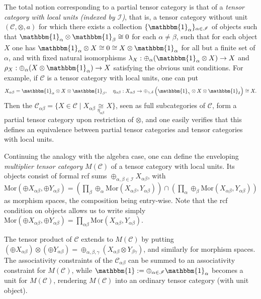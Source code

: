 \documentclass[10pt]{article}
\newcommand{\CatC}{\mathcal{C}}
\newcommand{\Mor}{\mathrm{Mor}}
\newcommand{\Unitb}{\mathbbm{1}}
\theoremstyle{definition}
\numberwithin{equation}{section}
\begin{document}
The total notion corresponding to a partial tensor category is that of a \emph{tensor category with local units (indexed by $\mathscr{I}$)}, that is, a tensor category without unit $(\CatC,\otimes,a)$  for which there exists a collection $\{\Unitb_\alpha\}_{\alpha\in \mathscr{I}}$ of objects such that $\Unitb_\alpha\otimes \Unitb_\beta \cong 0$ for each $\alpha\neq \beta$, such that for each object $X$ one has $\Unitb_\alpha\otimes X \cong 0 \cong X\otimes \Unitb_\alpha$ for all but a finite set of $\alpha$, and with fixed natural isomorphisms $\lambda_X:\oplus_\alpha (\Unitb_\alpha\otimes X) \rightarrow X$ and $\rho_X:\oplus_\alpha(X\otimes \Unitb_\alpha)\rightarrow X$ satisfying the obvious unit conditions. For example, if $\CatC$ is a tensor category with local units, one can put \[X_{\alpha\beta} = \Unitb_\alpha\otimes X \otimes \Unitb_\beta, \quad \eta_{\alpha\beta}:X_{\alpha\beta} \rightarrow \oplus_{\gamma,\delta} \left(\Unitb_\gamma \otimes X \otimes \Unitb_\delta\right) \cong X.\]  Then the $\CatC_{\alpha\beta} = \{X \in \CatC\mid X_{\alpha\beta} \underset{\eta_{\alpha\beta}}{\cong} X\}$, seen as full subcategories of $\CatC$, form a partial tensor category upon restriction of $\otimes$, and one easily verifies that this defines an equivalence between partial tensor categories and tensor categories with local units. 

Continuing the analogy with the algebra case, one can define the enveloping \emph{multiplier tensor category} $M(\CatC)$ of a tensor category with local units. Its objects consist of formal rcf sums $\oplus_{\alpha,\beta\in \mathscr{I}} X_{\alpha\beta}$, with $\Mor(\oplus X_{\alpha\beta},\oplus Y_{\alpha\beta}) = \left(\prod_\beta\oplus_\alpha  \Mor(X_{\alpha\beta},Y_{\alpha\beta}) \right) \cap \left(\prod_\alpha\oplus_\beta \Mor(X_{\alpha\beta},Y_{\alpha\beta})\right)$ as morphism spaces, the composition being entry-wise. Note that the rcf condition on objects allows us to write simply $\Mor(\oplus X_{\alpha\beta},\oplus Y_{\alpha\beta}) = \prod_{\alpha\beta} \Mor(X_{\alpha\beta},Y_{\alpha\beta})$.

The tensor product of $\CatC$ extends to $M(\CatC)$ by putting $\left(\oplus X_{\alpha\beta}\right)\otimes \left(\oplus Y_{\alpha\beta}\right) = \oplus_{\alpha,\beta,\gamma} \left(X_{\alpha\beta}\otimes Y_{\beta\gamma}\right)$, and similarly for morphism spaces. The associativity constraints of the $\CatC_{\alpha\beta}$ can be summed to an associativity constraint for $M(\CatC)$, while $\Unitb := \oplus_{\alpha\in \mathscr{I}} \Unitb_\alpha$ becomes a unit for $M(\CatC)$, rendering $M(\CatC)$ into an ordinary tensor category (with unit object).
\end{document}
